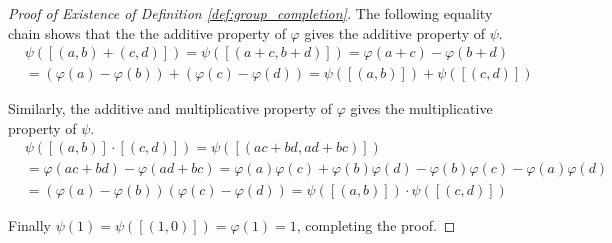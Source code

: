 \documentclass[../../sean_thesis.tex]{subfiles}
\begin{document}
\begin{proof}[Proof of Existence of Definition \ref{def:group_completion}]
The following equality chain shows that the the additive property of $\varphi$ gives the additive property of $\psi$.
\begin{align*}
	&\psi([(a,b)+(c,d)]) 
	= \psi([(a+c,b+d)])
	= \varphi(a+c) - \varphi(b+d)\\
	&= (\varphi(a)-\varphi(b)) + (\varphi(c)-\varphi(d))
	= \psi([(a,b)]) + \psi([(c,d)])
\end{align*}
	
Similarly, the additive and multiplicative property of $\varphi$ gives the multiplicative property of $\psi$.
\begin{align*}
	&\psi([(a,b)]\cdot[(c,d)])
	= \psi([(ac+bd, ad+bc)])\\
	&= \varphi(ac+bd)-\varphi(ad+bc)
	= \varphi(a)\varphi(c)+\varphi(b)\varphi(d)-\varphi(b)\varphi(c)-\varphi(a)\varphi(d)\\
	&= (\varphi(a)-\varphi(b))(\varphi(c)-\varphi(d))
	= \psi([(a,b)])\cdot\psi([(c,d)])
\end{align*}

Finally $\psi(1) = \psi([(1,0)]) = \varphi(1) = 1$, completing the proof.

\end{proof}
\end{document}
